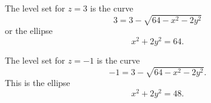 \documentclass{ximera}
\begin{document}
\begin{question}
\begin{explanation}
\begin{enumerate}
The level set for $z=3$ is the curve
\[
     3 = 3 - \sqrt{64 - x^2 - 2y^2}
\]
or the ellipse
\[
     x^2 + 2y^2 = 64.
\]

The level set for $z=-1$ is the curve
\[
     -1 = 3 - \sqrt{64 - x^2 - 2y^2}.
\]
This is the ellipse
\[
  x^2 + 2y^2 = 48.
\]

\begin{onlineOnly}
    \begin{center}
\end{center}
\end{onlineOnly}


\end{enumerate}
\end{explanation}

\end{question}



\end{document}

